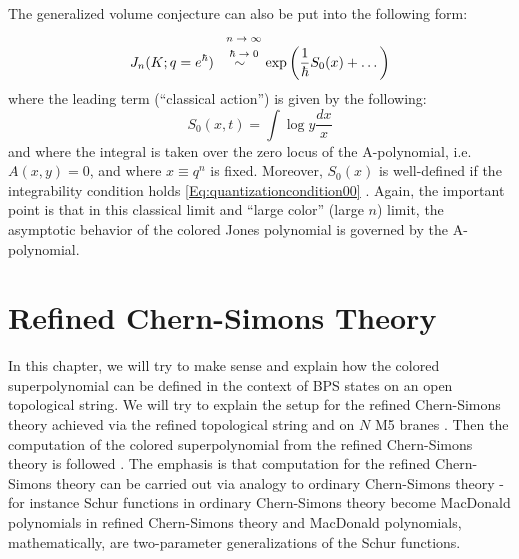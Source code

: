 \documentclass[a4paper,titlepage,twoside]{book}
\begin{document}



The generalized volume conjecture can also be put into the following form:
\begin{equation}
  J_n{ (K;q=e^{\hbar} ) } \overset{ \mbox{ \scriptsize{ $\begin{gathered} 
      n \to \infty \\
      \hbar \to 0 \end{gathered}$}} }{ \sim } \exp{ \left( \frac{1}{ \hbar} S_0{ (x)}  + \dots \right) }
\end{equation}
where the leading term (``classical action'') is given by the following:
\begin{equation}
  S_0(x,t) = \int \log{y} \frac{dx}{x}
\end{equation}
and where the integral is taken over the zero locus of the A-polynomial, i.e. $A(x,y) =0$, and where $x \equiv q^n$ is fixed.  Moreover, $S_0(x)$ is well-defined if the integrability condition holds \eqref{Eq:quantizationcondition00} \cite{GukovSaberi2012}.  Again, the important point is that in this classical limit and ``large color'' (large $n$) limit, the asymptotic behavior of the colored Jones polynomial is governed by the A-polynomial.   




\chapter{Refined Chern-Simons Theory} \label{chap:RefinedCStheory}

In this chapter, we will try to make sense and explain how the colored superpolynomial can be defined in the context of BPS states on an open topological string.  We will try to explain the setup for the refined Chern-Simons theory achieved via the refined topological string and on $N$ M5 branes \cite{AganagicShakirov2012}.  Then the computation of the colored superpolynomial from the refined Chern-Simons theory is followed \cite{FujiGukovSulkowski2012}.  The emphasis is that computation for the refined Chern-Simons theory can be carried out via analogy to ordinary Chern-Simons theory - for instance Schur functions in ordinary Chern-Simons theory become MacDonald polynomials in refined Chern-Simons theory and MacDonald polynomials, mathematically, are two-parameter generalizations of the Schur functions.  
\end{document}
